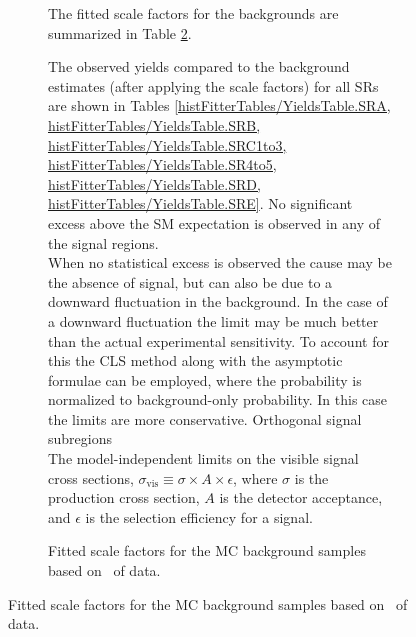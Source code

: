 \begin{figure}[htbp]
\begin{center}
\begin{figure}[htbp]
\begin{center}
{{{The fitted scale factors for the backgrounds are summarized in Table \ref{table.scale.factors}.  

\begin{table}
  \begin{center}
    
  \end{center}
  \caption{Fitted scale factors for the MC background samples based on
    \intlumi\ \ifb of data.}
  \label{table.scale.factors}
\end{table}

The observed yields compared to the background estimates (after applying the scale factors) for all SRs are shown in Tables \ref{histFitterTables/YieldsTable.SRA, histFitterTables/YieldsTable.SRB, histFitterTables/YieldsTable.SRC1to3, histFitterTables/YieldsTable.SR4to5, histFitterTables/YieldsTable.SRD, histFitterTables/YieldsTable.SRE}.  No significant excess above the SM expectation is observed in any of the signal regions. \\

When no statistical excess is observed the cause may be the absence of signal, but can also be due to a downward fluctuation in the background.  In the case of a downward fluctuation the limit may be much better than the actual experimental sensitivity.  To account for this the CLS method\cite{CLs1, CLs2} along with the asymptotic formulae\cite{likelihoodFit} can be employed, where the probability is normalized to background-only probability.  In this case the limits are more conservative. Orthogonal signal subregions  \\


The model-independent limits on the visible signal cross sections, $\sigma_{\textrm{vis}} \equiv \sigma \times A \times \epsilon$, where $\sigma$ is the production cross section, $A$ is the detector acceptance, and $\epsilon$ is the selection efficiency for a signal.  \\

}}}
\end{center}
\end{figure}
\end{center}
\end{figure}
